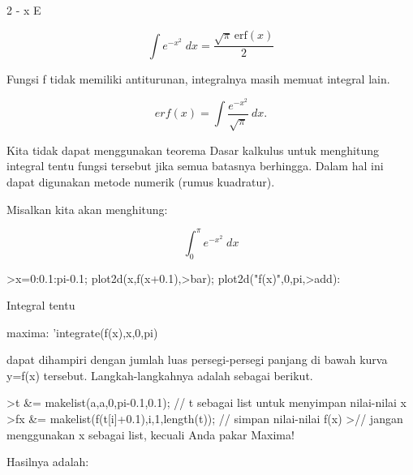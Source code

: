 \documentclass{article}
\begin{document}
\begin{eulernotebook}
\begin{eulercomment}
\begin{eulercomment}
\begin{euleroutput}
                                      2
                                   - x
                                  E
  
\end{euleroutput}
\begin{eulerformula}
\[
\int {e^ {- x^2 }}{\;dx}=\frac{\sqrt{\pi}\,\mathrm{erf}\left(x  \right)}{2}
\]
\end{eulerformula}
\begin{eulercomment}
Fungsi f tidak memiliki antiturunan, integralnya masih memuat integral
lain.

\end{eulercomment}
\begin{eulerformula}
\[
erf(x) = \int \frac{e^{-x^2}}{\sqrt{\pi}} \ dx.
\]
\end{eulerformula}
\begin{eulercomment}
Kita tidak dapat menggunakan teorema Dasar kalkulus untuk menghitung
integral tentu fungsi tersebut jika semua batasnya berhingga. Dalam
hal ini dapat digunakan metode numerik (rumus kuadratur).

Misalkan kita akan menghitung:

\end{eulercomment}
\begin{eulerformula}
\[
\int_{0}^{\pi}{e^ {- x^2 }\;dx}
\]
\end{eulerformula}
\begin{eulerprompt}
>x=0:0.1:pi-0.1; plot2d(x,f(x+0.1),>bar); plot2d("f(x)",0,pi,>add):
\end{eulerprompt}
\begin{eulercomment}
Integral tentu

maxima: 'integrate(f(x),x,0,pi)

dapat dihampiri dengan jumlah luas persegi-persegi panjang di bawah kurva y=f(x)
tersebut. Langkah-langkahnya adalah sebagai berikut.
\end{eulercomment}
\begin{eulerprompt}
>t &= makelist(a,a,0,pi-0.1,0.1); // t sebagai list untuk menyimpan nilai-nilai x
>fx &= makelist(f(t[i]+0.1),i,1,length(t)); // simpan nilai-nilai f(x)
>// jangan menggunakan x sebagai list, kecuali Anda pakar Maxima!
\end{eulerprompt}
\begin{eulercomment}
Hasilnya adalah:


\end{eulercomment}
\end{eulercomment}
\end{eulercomment}
\end{eulernotebook}
\end{document}

